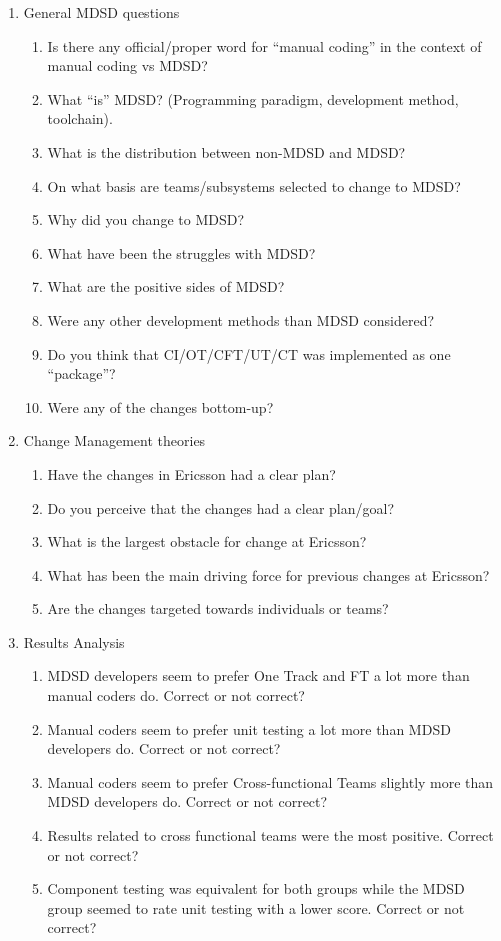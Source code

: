 \documentclass[final_report_innit.tex]{subfiles}
\begin{document}
\begin{enumerate}
	\item General MDSD questions
	\begin{enumerate}
		\item Is there any official/proper word for ``manual coding'' in the context of manual coding vs MDSD?
		\item What ``is'' MDSD? (Programming paradigm, development method, toolchain).
		\item What is the distribution between non-MDSD and MDSD?
		\item On what basis are teams/subsystems selected to change to MDSD?
		\item Why did you change to MDSD?
		\item What have been the struggles with MDSD?
		\item What are the positive sides of MDSD?
		\item Were any other development methods than MDSD considered?
		\item Do you think that CI/OT/CFT/UT/CT was implemented as one ``package''?
		\item Were any of the changes bottom-up?
	\end{enumerate}
	\item Change Management theories
	\begin{enumerate}
		\item Have the changes in Ericsson had a clear plan? 
		\item Do you perceive that the changes had a clear plan/goal?
		\item What is the largest obstacle for change at Ericsson?
		\item What has been the main driving force for previous changes at Ericsson?
		\item Are the changes targeted towards individuals or teams?
	\end{enumerate}
	\item Results Analysis
	\begin{enumerate}
		\item MDSD developers seem to prefer One Track and FT a lot more than manual coders do. Correct or not correct?
		\item Manual coders seem to prefer unit testing a lot more than MDSD developers do. Correct or not correct?
		\item Manual coders seem to prefer Cross-functional Teams slightly more than MDSD developers do. Correct or not correct?
		\item Results related to cross functional teams were the most positive. Correct or not correct?
		\item Component testing was equivalent for both groups while the MDSD group seemed to rate unit testing with a lower score. Correct or not correct?
	\end{enumerate}
\end{enumerate}
\end{document}
